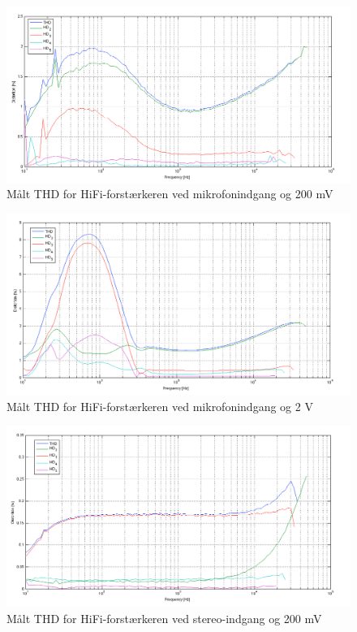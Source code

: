 \begin{figure}[h]
\centering
\includegraphics[width=\textwidth]{maalerapporter/final/mic/final_mic_3,16mv_thd.png}
\caption{Målt THD for HiFi-forstærkeren ved mikrofonindgang og 200 mV}
\label{maalerapport_final1}
\end{figure}

\begin{figure}[h]
\centering
\includegraphics[width=\textwidth]{maalerapporter/final/mic/final_mic_31,6mv_thd.png}
\caption{Målt THD for HiFi-forstærkeren ved mikrofonindgang og 2 V}
\label{maalerapport_final2}
\end{figure}

\begin{figure}[h]
\centering
\includegraphics[width=\textwidth]{maalerapporter/final/stereo/final_stereo_200mv_thd.png}
\caption{Målt THD for HiFi-forstærkeren ved stereo-indgang og 200 mV}
\label{maalerapport_final3}
\end{figure}

